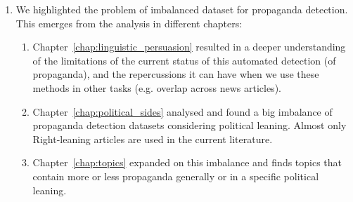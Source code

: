\begin{enumerate}
\begin{enumerate}

          \end{enumerate}
    \item We highlighted the problem of imbalanced dataset for propaganda detection. This emerges from the analysis in different chapters:
          \begin{enumerate}
              \item Chapter~\ref{chap:linguistic_persuasion} resulted in a deeper understanding of the limitations of the current status of this automated detection (of propaganda), and the repercussions it can have when we use these methods in other tasks (e.g. overlap across news articles).
              \item Chapter~\ref{chap:political_sides} analysed and found a big imbalance of propaganda detection datasets considering political leaning. Almost only Right-leaning articles are used in the current literature.
              \item Chapter~\ref{chap:topics} expanded on this imbalance and finds topics that contain more or less propaganda generally or in a specific political leaning.
          \end{enumerate}



\end{enumerate}
